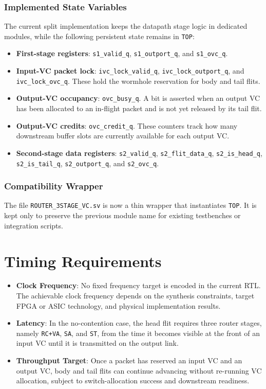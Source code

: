\documentclass[11pt,a4paper]{article}
\begin{document}
\subsubsection{Implemented State Variables}
The current split implementation keeps the datapath stage logic in dedicated modules, while the following persistent state remains in \texttt{TOP}:
\begin{itemize}
    \item \textbf{First-stage registers}: \texttt{s1\_valid\_q}, \texttt{s1\_outport\_q}, and \texttt{s1\_ovc\_q}.
    \item \textbf{Input-VC packet lock}: \texttt{ivc\_lock\_valid\_q}, \texttt{ivc\_lock\_outport\_q}, and \texttt{ivc\_lock\_ovc\_q}. These hold the wormhole reservation for body and tail flits.
    \item \textbf{Output-VC occupancy}: \texttt{ovc\_busy\_q}. A bit is asserted when an output VC has been allocated to an in-flight packet and is not yet released by its tail flit.
    \item \textbf{Output-VC credits}: \texttt{ovc\_credit\_q}. These counters track how many downstream buffer slots are currently available for each output VC.
    \item \textbf{Second-stage data registers}: \texttt{s2\_valid\_q}, \texttt{s2\_flit\_data\_q}, \texttt{s2\_is\_head\_q}, \texttt{s2\_is\_tail\_q}, \texttt{s2\_outport\_q}, and \texttt{s2\_ovc\_q}.
\end{itemize}

\subsubsection{Compatibility Wrapper}
The file \texttt{ROUTER\_3STAGE\_VC.sv} is now a thin wrapper that instantiates \texttt{TOP}. It is kept only to preserve the previous module name for existing testbenches or integration scripts.

\section{Timing Requirements}
\begin{itemize}
    \item \textbf{Clock Frequency}: No fixed frequency target is encoded in the current RTL. The achievable clock frequency depends on the synthesis constraints, target FPGA or ASIC technology, and physical implementation results.
    \item \textbf{Latency}: In the no-contention case, the head flit requires three router stages, namely \texttt{RC+VA}, \texttt{SA}, and \texttt{ST}, from the time it becomes visible at the front of an input VC until it is transmitted on the output link.
    \item \textbf{Throughput Target}: Once a packet has reserved an input VC and an output VC, body and tail flits can continue advancing without re-running VC allocation, subject to switch-allocation success and downstream readiness.
\end{itemize}
\end{document}
